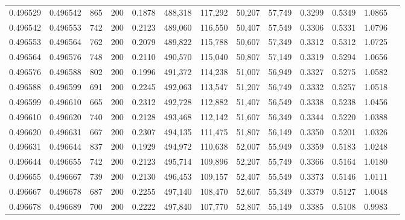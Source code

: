 \begin{tabular}{rrrrrrrrrrrrr}
0.496529 & 0.496542 &    865 & 200 &                                     0.1878 & 488,318 & 117,292 &  50,207 &  57,749 & 0.3299 & 0.5349 & 1.0865 \\
0.496542 & 0.496553 &    742 & 200 &                                     0.2123 & 489,060 & 116,550 &  50,407 &  57,549 & 0.3306 & 0.5331 & 1.0796 \\
0.496553 & 0.496564 &    762 & 200 &                                     0.2079 & 489,822 & 115,788 &  50,607 &  57,349 & 0.3312 & 0.5312 & 1.0725 \\
0.496564 & 0.496576 &    748 & 200 &                                     0.2110 & 490,570 & 115,040 &  50,807 &  57,149 & 0.3319 & 0.5294 & 1.0656 \\
0.496576 & 0.496588 &    802 & 200 &                                     0.1996 & 491,372 & 114,238 &  51,007 &  56,949 & 0.3327 & 0.5275 & 1.0582 \\
0.496588 & 0.496599 &    691 & 200 &                                     0.2245 & 492,063 & 113,547 &  51,207 &  56,749 & 0.3332 & 0.5257 & 1.0518 \\
0.496599 & 0.496610 &    665 & 200 &                                     0.2312 & 492,728 & 112,882 &  51,407 &  56,549 & 0.3338 & 0.5238 & 1.0456 \\
0.496610 & 0.496620 &    740 & 200 &                                     0.2128 & 493,468 & 112,142 &  51,607 &  56,349 & 0.3344 & 0.5220 & 1.0388 \\
0.496620 & 0.496631 &    667 & 200 &                                     0.2307 & 494,135 & 111,475 &  51,807 &  56,149 & 0.3350 & 0.5201 & 1.0326 \\
0.496631 & 0.496644 &    837 & 200 &                                     0.1929 & 494,972 & 110,638 &  52,007 &  55,949 & 0.3359 & 0.5183 & 1.0248 \\
0.496644 & 0.496655 &    742 & 200 &                                     0.2123 & 495,714 & 109,896 &  52,207 &  55,749 & 0.3366 & 0.5164 & 1.0180 \\
0.496655 & 0.496667 &    739 & 200 &                                     0.2130 & 496,453 & 109,157 &  52,407 &  55,549 & 0.3373 & 0.5146 & 1.0111 \\
0.496667 & 0.496678 &    687 & 200 &                                     0.2255 & 497,140 & 108,470 &  52,607 &  55,349 & 0.3379 & 0.5127 & 1.0048 \\
0.496678 & 0.496689 &    700 & 200 &                                     0.2222 & 497,840 & 107,770 &  52,807 &  55,149 & 0.3385 & 0.5108 & 0.9983 \\

\end{tabular}
